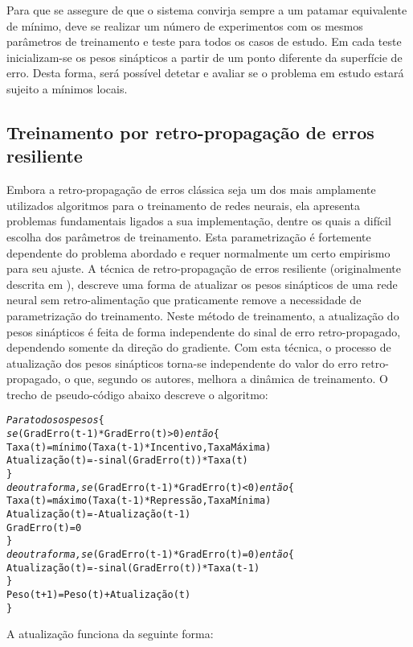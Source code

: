 Para que se assegure de que o sistema convirja sempre a um patamar equivalente
de mínimo, deve se realizar um número de experimentos com os mesmos parâmetros
de treinamento e teste para todos os casos de estudo. Em cada teste
inicializam-se os pesos sinápticos a partir de um ponto diferente da
superfície de erro. Desta forma, será possível detetar e avaliar se o problema
em estudo estará sujeito a mínimos locais.

\subsection{Treinamento por retro-propagação de erros resiliente}

Embora a retro-propagação de erros clássica seja um dos mais amplamente
utilizados algoritmos para o treinamento de redes neurais, ela apresenta
problemas fundamentais ligados a sua implementação, dentre os quais a difícil
escolha dos parâmetros de treinamento. Esta parametrização é fortemente
dependente do problema abordado e requer normalmente um certo empirismo para
seu ajuste. A técnica de retro-propagação de erros resiliente (originalmente
descrita em
\cite{rprop}), descreve uma forma de atualizar os pesos sinápticos de uma rede
neural sem retro-alimentação que praticamente remove a necessidade de
parametrização do treinamento. Neste método de treinamento, a atualização do
pesos sinápticos é feita de forma independente do sinal de erro
retro-propagado, dependendo somente da direção do gradiente. Com esta técnica,
o processo de atualização dos pesos sinápticos torna-se independente do valor
do erro retro-propagado, o que, segundo os autores, melhora a dinâmica de
treinamento. O trecho de pseudo-código abaixo descreve o algoritmo:

\begin{alltt}
\textit{Para todos os pesos} \{
  \textit{se} (GradErro(t-1) * GradErro(t) > 0) \textit{então} \{
    Taxa(t) = mínimo(Taxa(t-1) * Incentivo, TaxaMáxima)
    Atualização(t) = -sinal(GradErro(t)) * Taxa(t)
  \}
  \textit{de outra forma, se} (GradErro(t-1) * GradErro(t) < 0) \textit{então} \{
    Taxa(t) = máximo(Taxa(t-1) * Repressão, TaxaMínima)
    Atualização(t) = -Atualização(t-1)
    GradErro(t) = 0
  \}
  \textit{de outra forma, se} (GradErro(t-1) * GradErro(t) = 0) \textit{então} \{
    Atualização(t) = -sinal(GradErro(t)) * Taxa(t-1)
  \}
  Peso(t+1) = Peso(t) + Atualização(t)
\}
\end{alltt}

A atualização funciona da seguinte forma:

